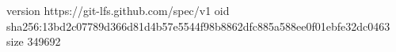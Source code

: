 version https://git-lfs.github.com/spec/v1
oid sha256:13bd2c07789d366d81d4b57e5544f98b8862dfc885a588ee0f01ebfe32dc0463
size 349692
